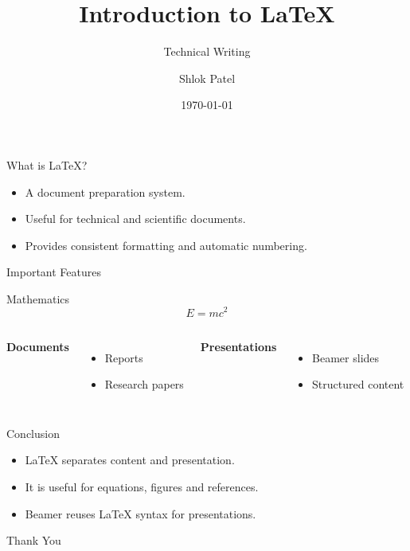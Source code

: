 \documentclass{beamer}
\title{Introduction to \LaTeX}
\subtitle{Technical Writing}
\author{Shlok Patel}
\institute{MNIT Jaipur}
\date{\today}
\begin{document}
\begin{frame}
  \titlepage
\end{frame}

\begin{frame}{What is \LaTeX?}
  \begin{itemize}
    \item A document preparation system.
    \item Useful for technical and scientific documents.
    \item Provides consistent formatting and automatic numbering.
  \end{itemize}
\end{frame}

\begin{frame}{Important Features}
  \begin{block}{Mathematics}
    \[
      E=mc^2
    \]
  \end{block}
  \begin{columns}
      \textbf{Documents}
      \begin{itemize}
        \item Reports
        \item Research papers
      \end{itemize}
      \textbf{Presentations}
      \begin{itemize}
        \item Beamer slides
        \item Structured content
      \end{itemize}
  \end{columns}
\end{frame}

\begin{frame}{Conclusion}
  \begin{itemize}
    \item LaTeX separates content and presentation.
    \item It is useful for equations, figures and references.
    \item Beamer reuses LaTeX syntax for presentations.
  \end{itemize}
  \centering
  \Large Thank You
\end{frame}
\end{document}
